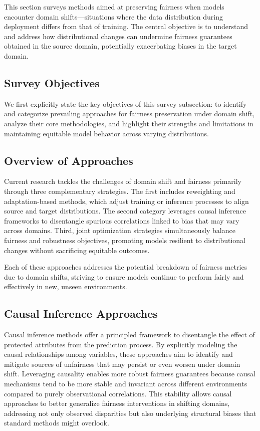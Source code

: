 \documentclass[sigconf]{acmart}
\begin{document}
This section surveys methods aimed at preserving fairness when models encounter domain shifts—situations where the data distribution during deployment differs from that of training. The central objective is to understand and address how distributional changes can undermine fairness guarantees obtained in the source domain, potentially exacerbating biases in the target domain.

\subsection{Survey Objectives}

We first explicitly state the key objectives of this survey subsection: to identify and categorize prevailing approaches for fairness preservation under domain shift, analyze their core methodologies, and highlight their strengths and limitations in maintaining equitable model behavior across varying distributions.

\subsection{Overview of Approaches}

Current research tackles the challenges of domain shift and fairness primarily through three complementary strategies. The first includes reweighting and adaptation-based methods, which adjust training or inference processes to align source and target distributions. The second category leverages causal inference frameworks to disentangle spurious correlations linked to bias that may vary across domains. Third, joint optimization strategies simultaneously balance fairness and robustness objectives, promoting models resilient to distributional changes without sacrificing equitable outcomes.

Each of these approaches addresses the potential breakdown of fairness metrics due to domain shifts, striving to ensure models continue to perform fairly and effectively in new, unseen environments.

\subsection{Causal Inference Approaches}
Causal inference methods offer a principled framework to disentangle the effect of protected attributes from the prediction process. By explicitly modeling the causal relationships among variables, these approaches aim to identify and mitigate sources of unfairness that may persist or even worsen under domain shift. Leveraging causality enables more robust fairness guarantees because causal mechanisms tend to be more stable and invariant across different environments compared to purely observational correlations. This stability allows causal approaches to better generalize fairness interventions in shifting domains, addressing not only observed disparities but also underlying structural biases that standard methods might overlook.
\end{document}
